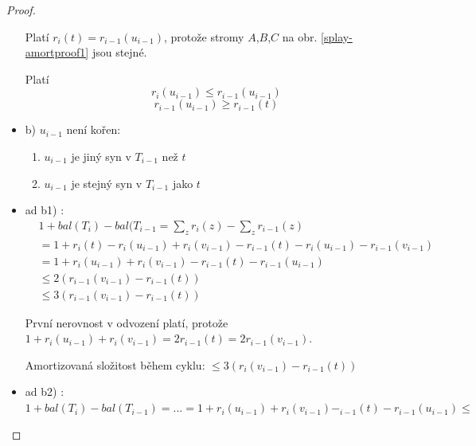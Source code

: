 \begin{proof}
\begin{itemize}
Platí $r_i(t) = r_{i-1}(u_{i-1})$, protože stromy $A$,$B$,$C$ na obr.
\ref{splay-amortproof1} jsou stejné.
\par
Platí
$$
r_i(u_{i-1}) \leq r_{i-1}(u_{i-1}) 
$$
$$
r_{i-1}(u_{i-1}) \geq r_{i-1}(t)
$$

\item b)
  $u_{i-1}$ není kořen: 
  \begin{enumerate}
  \item $u_{i-1}$ je jiný syn v $T_{i-1}$ než $t$
  \item $u_{i-1}$ je stejný syn v $T_{i-1}$ jako $t$
  \end{enumerate}
\end{itemize}

\par
\begin{itemize}
\item ad b1) : \\
\begin{equation}
\begin{split}
& 1 + bal(T_i) - bal(T_{i-1} = \sum_{z}{} r_i(z) - \sum_{z}{} r_{i-1}(z) \\
& = 1 + r_i(t) - r_i(u_{i-1}) + r_i(v_{i-1}) - r_{i-1}(t) - r_i(u_{i-1}) -
	r_{i-1}(v_{i-1}) \\
& = 1 + r_i(u_{i-1}) + r_i(v_{i-1}) - r_{i-1}(t) - r_{i-1}(u_{i-1}) \\
& \leq 2(r_{i-1}(v_{i-1}) - r_{i-1}(t)) \\
& \leq 3(r_{i-1}(v_{i-1}) - r_{i-1}(t))
\end{split}
\end{equation}

První nerovnost v odvození platí, protože 
$1 + r_i(u_{i-1}) + r_i(v_{i-1}) = 2r_{i-1}(t) = 2r_{i-1}(v_{i-1})$.
\par
Amortizovaná složitost během cyklu: $\leq 3(r_i(v_{i-1}) - r_{i-1}(t))$

\item ad b2) : \\

$1 + bal(T_i) - bal(T_{i-1}) = ... 
= 1 + r_i(u_{i-1}) + r_i(v_{i-1}) - _{i-1}(t) - r_{i-1}(u_{i-1}) \leq$


\end{itemize}
\end{proof}

